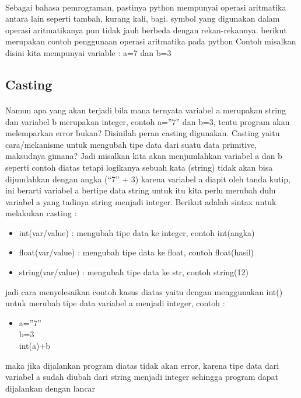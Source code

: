 \documentclass[a4paper,12pt]{report}
\begin{document}
\paragraph{}
Sebagai bahasa pemrograman, pastinya python mempunyai operasi aritmatika antara lain seperti tambah, kurang kali, bagi.  symbol yang digunakan dalam operasi aritmatikanya pun tidak jauh berbeda dengan rekan-rekannya.  berikut merupakan contoh penggunaan operasi aritmatika pada python
Contoh misalkan disini kita mempunyai variable : a=7 dan b=3\\
\subsection{Casting}
\paragraph{}
Namun apa yang akan terjadi bila mana ternyata variabel a merupakan string dan variabel b merupakan integer, contoh a=”7” dan b=3, tentu program akan melemparkan error bukan? Disinilah peran casting digunakan. Casting yaitu cara/mekanisme untuk mengubah tipe data dari suatu data primitive, maksudnya gimana? Jadi misalkan kita akan menjumlahkan variabel a dan b seperti contoh diatas tetapi logikanya sebuah kata (string) tidak akan bisa dijumlahkan dengan angka (“7” + 3) karena variabel a diapit oleh tanda kutip, ini berarti variabel a bertipe data string untuk itu kita perlu merubah dulu variabel a yang tadinya string menjadi integer. Berikut adalah sintax untuk melakukan casting :
\begin{itemize}
	\item int(var/value) : mengubah tipe data ke integer, contoh int(angka)
	\item float(var/value) : mengubah tipe data ke float, contoh float(hasil)
	\item string(var/value) : mengubah tipe data ke str, contoh string(12)
\end{itemize}
jadi cara menyelesaikan contoh kasus diatas yaitu dengan menggunakan int() untuk merubah tipe data variabel a menjadi integer, contoh :
\begin{itemize}

\item a=”7”\\
b=3\\
int(a)+b\\

\end{itemize}
maka jika dijalankan program diatas tidak akan error, karena tipe data dari variabel a sudah diubah dari string menjadi integer sehingga program dapat dijalankan dengan lancar
\end{document}
